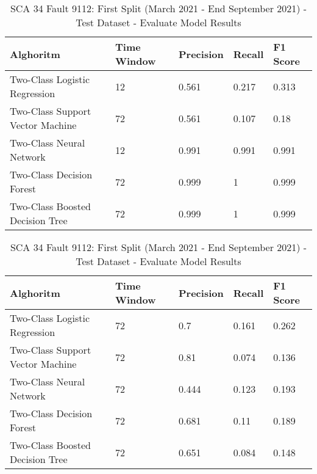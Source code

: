 \begin{table}[!ht]
    \centering
    \begin{tabular}{|l|l|l|l|l|}
    \hline
        Alghoritm & Time Window & Precision & Recall & F1 Score \\ \hline
        Two-Class Logistic Regression & 12 & 0.561 & 0.217 & 0.313 \\ \hline
        Two-Class Support Vector Machine & 72 & 0.561 & 0.107 & 0.18 \\ \hline
        Two-Class Neural Network & 12 & 0.991 & 0.991 & 0.991 \\ \hline
        Two-Class Decision Forest & 72 & 0.999 & 1 & 0.999 \\ \hline
        Two-Class Boosted Decision Tree & 72 & 0.999 & 1 & 0.999 \\ \hline
    \end{tabular}
    \caption{SCA 34 Fault 9112: First Split (March 2021 - End September 2021) - Test Dataset - Evaluate Model Results}
    \label{9112_SCA34_1st}
\end{table}

\begin{table}[!ht]
    \centering
    \begin{tabular}{|l|l|l|l|l|}
    \hline
        Alghoritm & Time Window & Precision & Recall & F1 Score \\ \hline
        Two-Class Logistic Regression & 72 & 0.7 & 0.161 & 0.262 \\ \hline
        Two-Class Support Vector Machine & 72 & 0.81 & 0.074 & 0.136 \\ \hline
        Two-Class Neural Network & 72 & 0.444 & 0.123 & 0.193 \\ \hline
        Two-Class Decision Forest & 72 & 0.681 & 0.11 & 0.189 \\ \hline
        Two-Class Boosted Decision Tree & 72 & 0.651 & 0.084 & 0.148 \\ \hline
    \end{tabular}
    \caption{SCA 34 Fault 9112: First Split (March 2021 - End September 2021) - Test Dataset - Evaluate Model Results}
    \label{9112_SCA34_1st}
\end{table}

